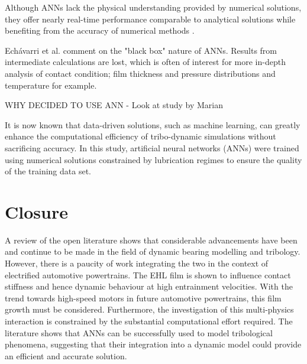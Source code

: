 Although ANNs lack the physical understanding provided by numerical solutions, they offer nearly real-time performance comparable to analytical solutions while benefiting from the accuracy of numerical methods \cite{EchavarriOtero2014}.

Echávarri et al. \cite{EchavarriOtero2014} comment on the "black box" nature of ANNs. Results from intermediate calculations are lost, which is often of interest for more in-depth analysis of contact condition; film thickness and pressure distributions and temperature for example. 

WHY DECIDED TO USE ANN - Look at study by Marian


It is now known that data-driven solutions, such as machine learning, can greatly enhance the computational efficiency of tribo-dynamic simulations without sacrificing accuracy. In this study, artificial neural networks (ANNs) were trained using numerical solutions constrained by lubrication regimes to ensure the quality of the training data set.

\section{Closure}
A review of the open literature shows that considerable advancements have been and continue to be made in the field of dynamic bearing modelling and tribology. However, there is a paucity of work integrating the two in the context of electrified automotive powertrains. The EHL film is shown to influence contact stiffness and hence dynamic behaviour at high entrainment velocities. With the trend towards high-speed motors in future automotive powertrains, this film growth must be considered. Furthermore, the investigation of this multi-physics interaction is constrained by the substantial computational effort required. The literature shows that ANNs can be successfully used to model tribological phenomena, suggesting that their integration into a dynamic model could provide an efficient and accurate solution.